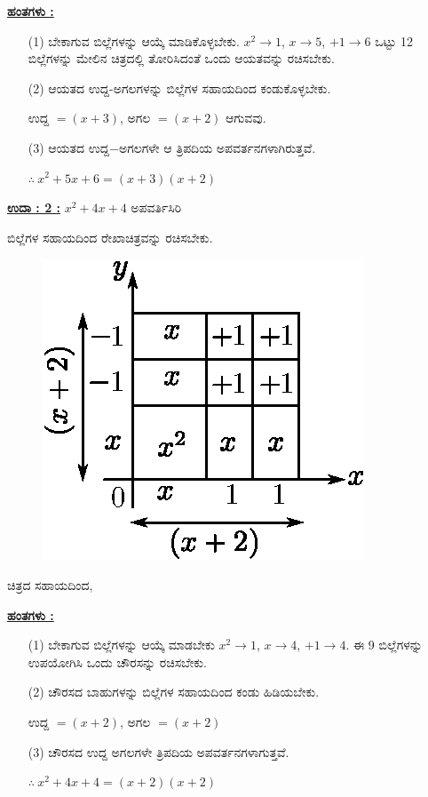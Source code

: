 \noindent
{\textbf{\underline{ಹಂತಗಳು :}}}
\begin{itemize}
\item [(1)] ಬೇಕಾಗುವ ಬಿಲ್ಲೆಗಳನ್ನು ಆಯ್ಕೆ ಮಾಡಿಕೊಳ್ಳಬೇಕು. $x^2 \rightarrow 1$, $x \rightarrow 5$, $+1 \rightarrow 6$ ಒಟ್ಟು 12 ಬಿಲ್ಲೆಗಳನ್ನು ಮೇಲಿನ ಚಿತ್ರದಲ್ಲಿ ತೋರಿಸಿದಂತೆ ಒಂದು ಆಯತ\-ವನ್ನು ರಚಿಸಬೇಕು. 
\item [(2)] ಆಯತದ ಉದ್ದ-ಅಗಲಗಳನ್ನು ಬಿಲ್ಲೆಗಳ ಸಹಾಯದಿಂದ ಕಂಡುಕೊಳ್ಳಬೇಕು. 

ಉದ್ದ $= (x+3)$, ಅಗಲ $= (x+2)$ ಆಗುವವು.

\item [(3)] ಆಯತದ ಉದ್ದ$-$ಅಗಲಗಳೇ ಆ ತ್ರಿಪದಿಯ ಅಪವರ್ತನಗಳಾಗಿರುತ್ತವೆ. 

$\therefore~ x^2 + 5x + 6 = (x+3)(x+2)$
\end{itemize}


\noindent
{\textbf{\underline{ಉದಾ : 2 :}}} $x^2 + 4x + 4$ ಅಪವರ್ತಿಸಿರಿ 

ಬಿಲ್ಲೆಗಳ ಸಹಾಯದಿಂದ ರೇಖಾಚಿತ್ರವನ್ನು ರಚಿಸಬೇಕು.
\begin{figure}[H]
\centering
\includegraphics[scale=0.8]{src/figure/chap3/fig3-40.eps}
\end{figure}
ಚಿತ್ರದ ಸಹಾಯದಿಂದ,

\noindent
{\textbf{\underline{ಹಂತಗಳು :}}}
\begin{itemize}
\item [(1)] ಬೇಕಾಗುವ ಬಿಲ್ಲೆಗಳನ್ನು ಆಯ್ಕೆ ಮಾಡಬೇಕು $x^2 \rightarrow 1$, $x \rightarrow 4$, $+1 \rightarrow 4$. ಈ 9 ಬಿಲ್ಲೆಗಳನ್ನು ಉಪಯೋಗಿಸಿ ಒಂದು ಚೌರಸನ್ನು ರಚಿಸಬೇಕು. 
\item [(2)] ಚೌರಸದ ಬಾಹುಗಳನ್ನು ಬಿಲ್ಲೆಗಳ ಸಹಾಯದಿಂದ ಕಂಡು ಹಿಡಿಯಬೇಕು. 

ಉದ್ದ $= (x+2)$, ಅಗಲ $= (x+2)$
\item [(3)] ಚೌರಸದ ಉದ್ದ ಅಗಲಗಳೇ ತ್ರಿಪದಿಯ ಅಪವರ್ತನಗಳಾಗುತ್ತವೆ. 

$\therefore~ x^2 + 4x + 4 = (x+2)(x+2)$
\end{itemize}

